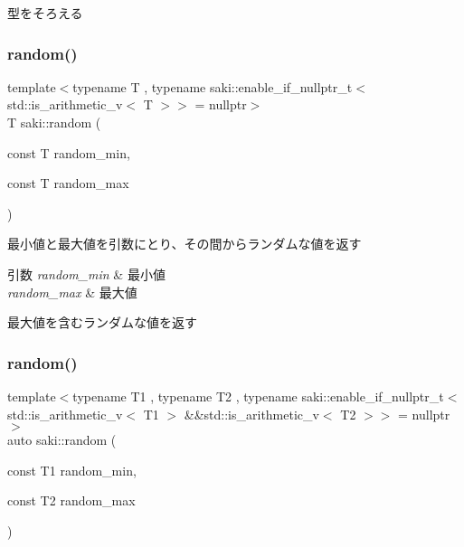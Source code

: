 型をそろえる 

\mbox{\label{namespacesaki_adec39fdef417fa75fb6a6bd06b08490c}} 
\subsubsection{\texorpdfstring{random()}{random()}\hspace{0.1cm}{\footnotesize\ttfamily [1/2]}}
{\footnotesize\ttfamily template$<$typename T , typename saki\+::enable\+\_\+if\+\_\+nullptr\+\_\+t$<$ std\+::is\+\_\+arithmetic\+\_\+v$<$ T $>$$>$  = nullptr$>$ \\
T saki\+::random (\begin{DoxyParamCaption}\item[{const T}]{random\+\_\+min,  }\item[{const T}]{random\+\_\+max }\end{DoxyParamCaption})}



最小値と最大値を引数にとり、その間からランダムな値を返す 


\begin{DoxyParams}{引数}
{\em random\+\_\+min} & 最小値 \\
\hline
{\em random\+\_\+max} & 最大値\\
\hline
\end{DoxyParams}
最大値を含むランダムな値を返す \mbox{\label{namespacesaki_a8a3d0c8d244f1f8e5c6c8310f7e7b647}} 
\subsubsection{\texorpdfstring{random()}{random()}\hspace{0.1cm}{\footnotesize\ttfamily [2/2]}}
{\footnotesize\ttfamily template$<$typename T1 , typename T2 , typename saki\+::enable\+\_\+if\+\_\+nullptr\+\_\+t$<$ std\+::is\+\_\+arithmetic\+\_\+v$<$ T1 $>$ \&\&std\+::is\+\_\+arithmetic\+\_\+v$<$ T2 $>$$>$  = nullptr$>$ \\
auto saki\+::random (\begin{DoxyParamCaption}\item[{const T1}]{random\+\_\+min,  }\item[{const T2}]{random\+\_\+max }\end{DoxyParamCaption})}

